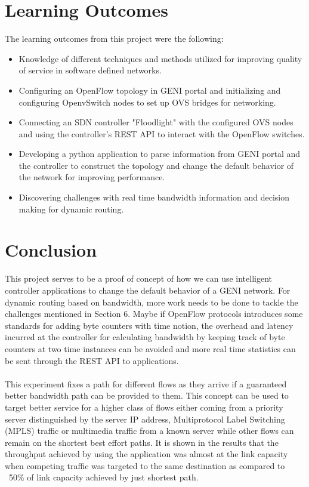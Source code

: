 \documentclass[paper=a4, fontsize=12pt]{scrartcl}	%
\numberwithin{equation}{section}		%
\numberwithin{figure}{section}			%
\numberwithin{table}{section}				%
\begin{document}
\section{Learning Outcomes}
The learning outcomes from this project were the following:
\begin{itemize}
\item Knowledge of different techniques and methods utilized for improving quality of service in software defined networks.
\item Configuring an OpenFlow topology in GENI portal and initializing and configuring OpenvSwitch nodes to set up OVS bridges for networking.
\item Connecting an SDN controller "Floodlight" with the configured OVS nodes and using the controller's REST API to interact with the OpenFlow switches.
\item Developing a python application to parse information from GENI portal and the controller to construct the topology and change the default behavior of the network for improving performance.
\item Discovering challenges with real time bandwidth information and decision making for dynamic routing.
\end{itemize}

\section{Conclusion}
This project serves to be a proof of concept of how we can use intelligent controller applications to change the default behavior of a GENI network. For dynamic routing based on bandwidth, more work needs to be done to tackle the challenges mentioned in Section 6. Maybe if OpenFlow protocols introduces some standards for adding byte counters with time notion, the overhead and latency incurred at the controller for calculating bandwidth by keeping track of byte counters at two time instances can be avoided and more real time statistics can be sent through the REST API to applications.
\\
\\
This experiment fixes a path for different flows as they arrive if a guaranteed better bandwidth path can be provided to them. This concept can be used to target better service for a higher class of flows either coming from a priority server distinguished by the server IP address, Multiprotocol Label Switching (MPLS) traffic or multimedia traffic from a known server while other flows can remain on the shortest best effort paths. It is shown in the results that the throughput achieved by using the application was almost at the link capacity when competing traffic was targeted to the same destination as compared to ~50\% of link capacity achieved by just shortest path.

\end{document}
